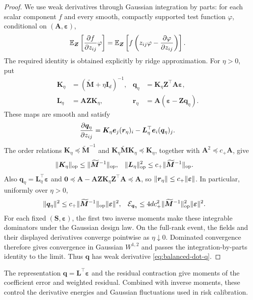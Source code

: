 \documentclass{article}
\theoremstyle{plain}
\theoremstyle{definition}
\theoremstyle{definition}
\newcommand{\boldzero}{\mathbf{0}}
\DeclarePairedDelimiter\norm{\lVert}{\rVert}
\def\E{{\mathbb{E}}}
\def\mathbold{\boldsymbol}
\def\cal{\mathcal}
\def\bA{\mathbold{A}}\def\calA{{\cal A}}\def\scrA{{\mathscr A}}\def\Ahat{\widehat{A}}\def\Atil{{\widetilde A}}
\def\bI{\mathbold{I}}\def\hbI{{\widehat{\bI}}}\def\tbI{{\widetilde{\bI}}}
\def\bK{\mathbold{K}}\def\hbK{{\widehat{\bK}}}\def\tbK{{\widetilde{\bK}}}
\def\bL{\mathbold{L}}\def\hbL{{\widehat{\bL}}}\def\tbL{{\widetilde{\bL}}}
\def\bM{\mathbold{M}}\def\hbM{{\widehat{\bM}}}\def\tbM{{\widetilde{\bM}}}
\def\bq{\mathbold{q}}\def\qhat{\widehat{q}}\def\qtil{\widetilde{q}}\def\qbar{{\overline q}}
\def\br{\mathbold{r}}\def\rhat{\widehat{r}}\def\rtil{\widetilde{r}}\def\rbar{{\overline r}}
\def\bS{\mathbold{S}}\def\hbS{{\widehat{\bS}}}\def\tbS{{\widetilde{\bS}}}
\def\be{\mathbold{e}}
\def\bZ{\mathbold{Z}}\def\hbZ{{\widehat{\bZ}}}\def\tbZ{{\widetilde{\bZ}}}
\def\ep{\varepsilon}\def\eps{\epsilon}\def\veps{\varepsilon}
\def\bep{ {\mathbold{\ep} }}
\begin{document}
\begin{proof}
We use weak derivatives through Gaussian integration by parts: for each
scalar component $f$ and every smooth, compactly supported test function
$\varphi$, conditional on $(\bA,\bep)$,
\begin{align*}
    \E_{\bZ}\left[\pdv{f}{z_{ij}}\varphi\right]
    =\E_{\bZ}\left[f\left(z_{ij}\varphi-\pdv{\varphi}{z_{ij}}\right)\right].
\end{align*}
The required identity is obtained explicitly by ridge approximation.
For $\eta>0$, put
\begin{align*}
    \bK_\eta&=(\widetilde{\bM}+\eta\bI_d)^{-1},
    & \bq_\eta&=\bK_\eta\bZ^\top\bA\bep,\\
    \bL_\eta&=\bA\bZ\bK_\eta,
    & \br_\eta&=\bA(\bep-\bZ\bq_\eta).
\end{align*}
These maps are smooth and satisfy
\begin{align*}
    \pdv{\bq_\eta}{z_{ij}}
    =\bK_\eta\be_j(\br_\eta)_i
      -\bL_\eta^\top\be_i(\bq_\eta)_j.
\end{align*}
The order relations $\bK_\eta\preceq\widetilde{\bM}^{-1}$ and
$\bK_\eta\widetilde{\bM}\bK_\eta\preceq\bK_\eta$, together with
$\bA^2\preceq c_+\bA$, give
\begin{align*}
    \norm{\bK_\eta}_{\rm op}
    &\leq\norm{\widetilde{\bM}^{-1}}_{\rm op},
    &
    \norm{\bL_\eta}_{\rm op}^2
    &\leq c_+\norm{\widetilde{\bM}^{-1}}_{\rm op}.
\end{align*}
Also $\bq_\eta=\bL_\eta^\top\bep$ and
$\boldzero\preceq\bA-\bA\bZ\bK_\eta\bZ^\top\bA\preceq\bA$,
so $\norm{\br_\eta}\leq c_+\norm{\bep}$.
In particular, uniformly over $\eta>0$,
\begin{align*}
    \norm{\bq_\eta}^2
    &\leq c_+\norm{\widetilde{\bM}^{-1}}_{\rm op}\norm{\bep}^2,
    &
    \calE_{\bq_\eta}
    &\leq4dc_+^2\norm{\widetilde{\bM}^{-1}}_{\rm op}^2\norm{\bep}^2.
\end{align*}
For each fixed $(\bS,\bep)$, the first two inverse moments make these
integrable dominators under the Gaussian design law. On the full-rank
event, the fields and their displayed derivatives converge pointwise as
$\eta\downarrow0$. Dominated convergence therefore gives convergence in
Gaussian $W^{1,2}$ and passes the integration-by-parts identity to the limit.
Thus $\bq$ has weak derivative \eqref{eq:balanced-dot-q}.
\end{proof}

The representation $\bq=\bL^\top\bep$ and the residual contraction give
moments of the coefficient error and weighted residual. Combined with
inverse moments, these control the derivative energies and Gaussian
fluctuations used in risk calibration.
\end{document}
